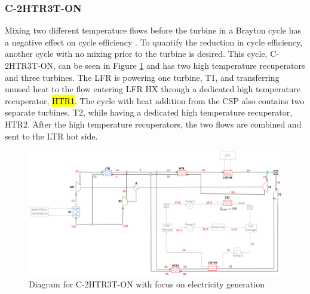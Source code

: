 \begin{paracol}{2}
\linenumbers
\switchcolumn

\subsubsection{C-2HTR3T-ON} 

Mixing two different temperature flows before the turbine in a Brayton cycle has a negative effect on cycle efficiency . To quantify the reduction in cycle efficiency, another cycle with no mixing prior to the turbine is desired. This cycle, C-2HTR3T-ON, can be seen in Figure \ref{c-2htr3t-on} and has two high temperature recuperators and three turbines. The LFR is powering one turbine, T1, and transferring unused heat to the flow entering LFR HX through a dedicated high temperature recuperator, \hl{HTR1}. 
The cycle with heat addition from the CSP also contains two separate turbines, T2, while having a dedicated high temperature recuperator, HTR2. 
After the high temperature recuperators, the two flows are combined and sent to the LTR hot side. 

\end{paracol}
\begin{figure}[H]
    \widefigure
    \includegraphics[width=\linewidth]{Definitions/c-2htr3t-on.pdf}
    \caption{Diagram for C-2HTR3T-ON with focus on electricity generation\label{c-2htr3t-on}}
\end{figure}
